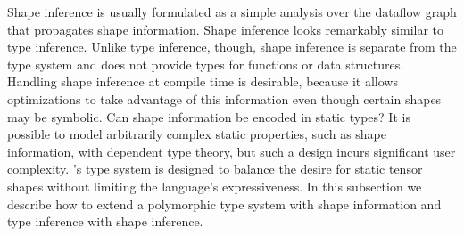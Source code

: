   Shape inference is usually formulated as a simple analysis over the dataflow graph that
    propagates shape information.
  Shape inference looks remarkably similar to type inference.
  Unlike type inference, though, shape inference is separate from the type system and
    does not provide types for functions or data structures.
  Handling shape inference at compile time is desirable, because it allows optimizations to take
    advantage of this information even though certain shapes may be symbolic. Can shape information be encoded in static types?
  It is possible to model arbitrarily complex static properties, such
    as shape information, with dependent type theory, but such
    a design incurs significant user complexity.
  \relay's type system is designed to balance the desire for static tensor shapes
    without limiting the language's expressiveness.
  In this subsection we describe how to extend a polymorphic type system with shape
    information and type inference with shape inference.

